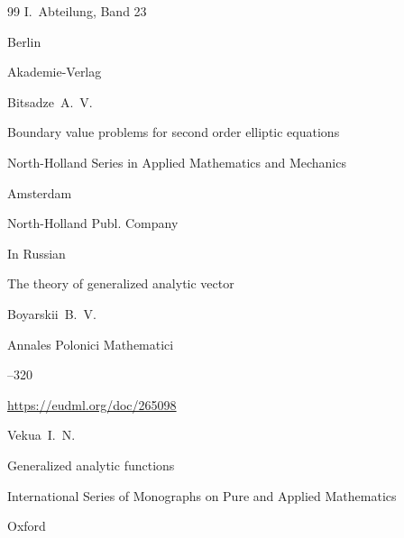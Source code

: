 \begin{thebibliography}{99}
\bookinfo I.~Abteilung, Band 23

\publaddr Berlin

\publ Akademie-Verlag







\by Bitsadze~A.~V.

\book Boundary value problems for second order elliptic equations

\serial North-Holland Series in Applied Mathematics and Mechanics


\publaddr Amsterdam

\publ North-Holland Publ. Company













\lang In Russian

\paper The theory of generalized analytic vector

\by Boyarskii~B.~V.

\jour Annales Polonici Mathematici




--320

\elink \url{https://eudml.org/doc/265098}










\by Vekua~I.~N.

\book Generalized analytic functions


\serial International Series of Monographs on Pure and Applied Mathematics


\publaddr Oxford 


\end{thebibliography}
